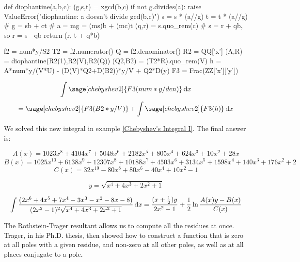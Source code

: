 \begin{sageblock}[chebyshev2]
def diophantine(a,b,c):
   (g,s,t) = xgcd(b,c)
   if not g.divides(a):
      raise ValueError("diophantine: a doesn't divide gcd(b,c)")
   s = s * (a//g)
   t = t * (a//g)
   # g = sb + ct
   # a = mg = (ms)b + (mc)t
   (q,r) = s.quo_rem(c)
   # s = r + qb, so r = s - qb
   return (r, t + q*b)
\end{sageblock}

\begin{sageblock}[chebyshev2]
f2 = num*y/S2
T2 = f2.numerator()
Q = f2.denominator()
R2 = QQ['x']
(A,R) = diophantine(R2(1),R2(V),R2(Q))
(Q2,B2) = (T2*R).quo_rem(V)
h = A*num*y/(V*U) - (D(V)*Q2+D(B2))*y/V + Q2*D(y)
F3 = Frac(ZZ['x']['y'])
\end{sageblock}

$$\int \sage[chebyshev2]{F3(num*y/den)}\,{\rm d}x$$
$$=\sage[chebyshev2]{F3(B2*y/V)} + \int \sage[chebyshev2]{F3(h)}\,{\rm d}x$$

We solved this new integral in example \ref{Chebyshev's Integral I}.
The final answer is:

$$A(x) = 1023x^8+4104x^7+5048x^6+2182x^5+805x^4+624x^3+10x^2+28x$$
$$B(x) = 1025x^{10} + 6138x^9 + 12307x^8 + 10188x^7 + 4503x^6 + 3134x^5 + 1598x^4 + 140x^3 + 176x^2 +2$$
$$C(x) = 32x^{10}-80x^8+80x^6-40x^4+10x^2-1$$

$$y = \sqrt{x^4+4 x^3+2 x^2+1}$$

$$\int {{(2x^6+4x^5+7x^4-3x^3-x^2-8x-8)}\over{(2x^2-1)^2\sqrt{x^4+4 x^3+2 x^2+1}}} \,{\rm d}x
= {{(x+{1\over2})y}\over{2x^2-1}} + {1\over2}\ln{{A(x)y - B(x)}\over{C(x)}}
$$

\endexample


\vfill\eject
{}

The Rothstein-Trager resultant allows us to compute all the residues
at once.  Trager, in his Ph.D. thesis, then showed how to construct a
function that is zero at all poles with a given residue, and non-zero
at all other poles, as well as at all places conjugate to a pole.
